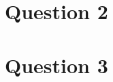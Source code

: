 \documentclass[12pt]{article}
\begin{document}
\section*{Question 2}

\section*{Question 3}
\end{document}
